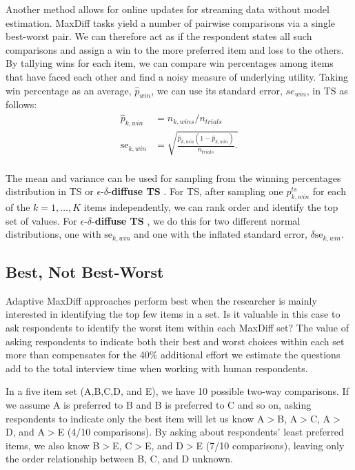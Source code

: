 \documentclass[nonblindrev]{informs3}
\newcommand{\edts}{$\epsilon$-$\delta$-\textbf{diffuse TS} }
\begin{document}
\begin{APPENDICES}
Another method allows for online updates for streaming data without model estimation. MaxDiff tasks yield a number of pairwise comparisons via a single best-worst pair. We can therefore act as if the respondent states all such comparisons and assign a win to the more preferred item and loss to the others. By tallying wins for each item, we can compare win percentages among items that have faced each other and find a noisy measure of underlying utility. Taking win percentage as an average, $\hat{p}_{win}$, we can use its standard error, $se_{win}$, in TS as follows:
\begin{align}
\hat{p}_{k,win} &= n_{k,wins} / n_{trials} \\
\text{se}_{k,win} &= \sqrt{  \frac{ \hat{p}_{k,win} (1-\hat{p}_{k,win}) } {n_{trials}}.  } \\
\end{align}

The mean and variance can be used for sampling from the winning percentages distribution in TS or \edts. For TS, after sampling one $p_{k,win}^{ts}$ for each of the $k=1,\ldots,K$ items independently, we can rank order and identify the top set of values. For \edts, we do this for two different normal distributions, one with $\text{se}_{k,win}$ and one with the inflated standard error, $\delta \text{se}_{k,win}$.


\subsection{Best, Not Best-Worst}

Adaptive MaxDiff approaches perform best when the researcher is mainly interested in identifying the top few items in a set. Is it valuable in this case to ask respondents to identify the worst item within each MaxDiff set? The value of asking respondents to indicate both their best and worst choices within each set more than compensates for the 40\% additional effort we estimate the questions add to the total interview time when working with human respondents.

In a five item set (A,B,C,D, and E), we have 10 possible two-way comparisons. If we assume A is preferred to B and B is preferred to C and so on, asking respondents to indicate only the best item will let us know A$>$B, A$>$C, A$>$D, and A$>$E (4/10 comparisons). By asking about respondents' least preferred items, we also know B$>$E, C$>$E, and D$>$E (7/10 comparisons), leaving only the order relationship between B, C, and D unknown.


\end{APPENDICES}
\end{document}

